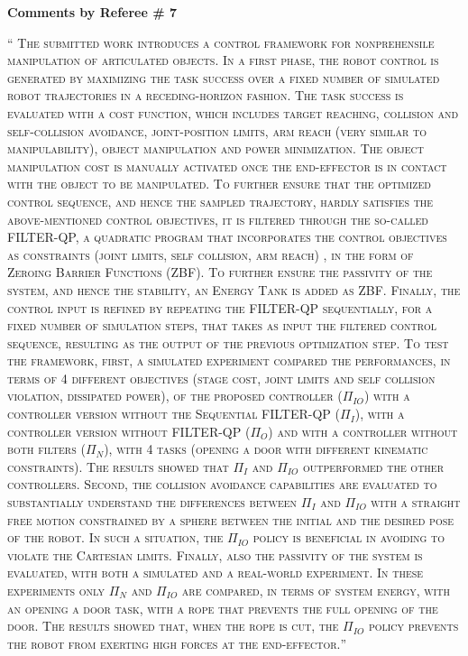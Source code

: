 \documentclass[10pt]{article}
\newcommand{\referee}[1]{\;
  \begin{minipage}[t]{.95\textwidth}
    ``{\small\color{red} \textsc{#1}}''
  \end{minipage}\medskip
  }
\begin{document}
\clearpage
\bigskip
\hspace*{-25pt} \textbf{\large Comments by Referee \# 7}


\begin{enumerate}[label={[R7:\,\arabic{enumi}]}]

\item\label{reply:R7:0}
\referee{The submitted work introduces a control framework for nonprehensile manipulation of articulated objects. In a first phase, the robot control is generated by maximizing the task success over a fixed number of simulated robot trajectories in a receding-horizon fashion.
The task success is evaluated with a cost function, which includes target reaching, collision and self-collision avoidance, joint-position limits, arm reach (very similar to manipulability), object manipulation and power minimization. The object manipulation cost is manually activated once the end-effector is in contact with the object to be manipulated. To further ensure that the optimized control sequence, and hence the sampled trajectory, hardly satisfies the above-mentioned control objectives, it is filtered through the so-called FILTER-QP, a quadratic program that incorporates the control objectives as constraints (joint limits, self collision, arm reach) , in the form of Zeroing Barrier Functions (ZBF). To further ensure the passivity of the
system, and hence the stability, an Energy Tank is added as ZBF. Finally, the control input is refined by repeating the FILTER-QP sequentially, for a fixed number of simulation steps, that takes as input the filtered control sequence, resulting as the output of the previous optimization step.  To test the framework, first, a simulated experiment compared the performances, in terms of 4 different objectives (stage cost, joint limits and self collision violation, dissipated power), of the proposed controller ($\Pi_{IO}$) with a controller version without the Sequential FILTER-QP ($\Pi_{I}$), with a controller version without FILTER-QP ($\Pi_{O}$) and with a controller without both filters ($\Pi_{N}$), with 4 tasks (opening a door with different kinematic constraints). The results
showed that $\Pi_{I}$ and $\Pi_{IO}$ outperformed the other controllers. 
Second, the collision avoidance capabilities are evaluated to substantially understand the differences between $\Pi_{I}$ and $\Pi_{IO}$ with a straight free motion constrained by a sphere between the initial and the desired pose of the robot. In such a situation, the $\Pi_{IO}$ policy is
beneficial in avoiding to violate the Cartesian limits. Finally, also the passivity of the system is evaluated, with both a simulated and a real-world experiment. In these experiments only $\Pi_{N}$
and $\Pi_{IO}$ are compared, in terms of system energy, with an opening a door task, with a rope that prevents the full opening of the door. The results showed that, when the rope is cut, the $\Pi_{IO}$ policy prevents the robot from exerting high forces at the end-effector.}



\end{enumerate}
\end{document}
